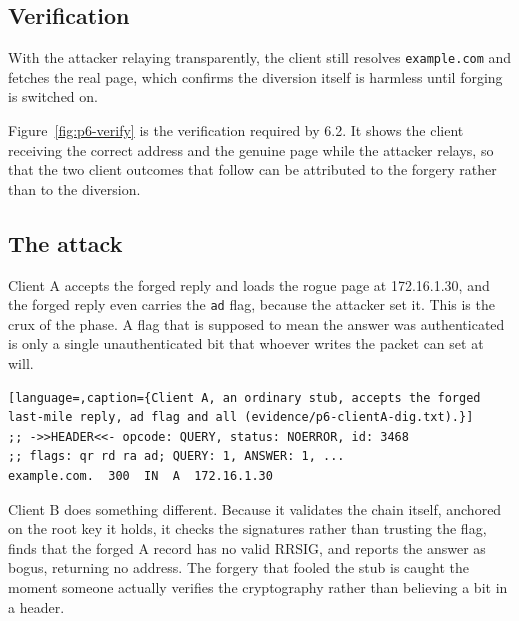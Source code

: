 \documentclass[11pt]{article}
\begin{document}
\subsection{Verification}

With the attacker relaying transparently, the client still resolves
\texttt{example.com} and fetches the real page, which confirms the diversion itself
is harmless until forging is switched on.


Figure~\ref{fig:p6-verify} is the verification required by 6.2.
It shows the client receiving the correct address and the genuine page while
the attacker relays, so that the two client outcomes that follow can be attributed
to the forgery rather than to the diversion.

\subsection{The attack}

Client A accepts the forged reply and loads the rogue page at 172.16.1.30, and the
forged reply even carries the \texttt{ad} flag, because the attacker set it. This
is the crux of the phase. A flag that is supposed to mean the answer was
authenticated is only a single unauthenticated bit that whoever writes the packet
can set at will.

\begin{lstlisting}[language=,caption={Client A, an ordinary stub, accepts the forged last-mile reply, ad flag and all (evidence/p6-clientA-dig.txt).}]
;; ->>HEADER<<- opcode: QUERY, status: NOERROR, id: 3468
;; flags: qr rd ra ad; QUERY: 1, ANSWER: 1, ...
example.com.  300  IN  A  172.16.1.30
\end{lstlisting}

Client B does something different. Because it validates the chain itself, anchored
on the root key it holds, it checks the signatures rather than trusting the flag,
finds that the forged A record has no valid RRSIG, and reports the answer as bogus,
returning no address. The forgery that fooled the stub is caught the moment
someone actually verifies the cryptography rather than believing a bit in a header.
\end{document}
